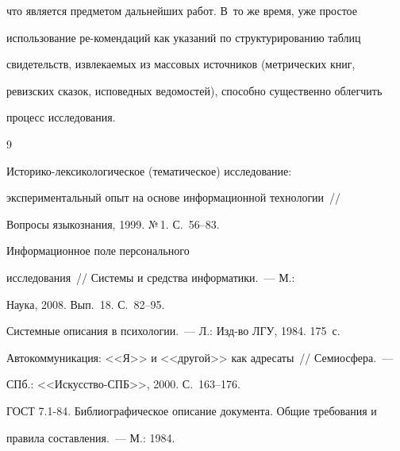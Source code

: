 что является предметом дальнейших работ.  В~то же время, уже простое 


использование ре-\linebreak комендаций как указаний по структурированию таблиц 


свидетельств, извле\-ка\-емых из массовых источников  (метрических книг, 


ревизских сказок, исповедных ведомостей), способно существенно облегчить 


процесс исследования.





{\small\frenchspacing


{%




\begin{thebibliography}{9}









Историко-лексикологическое (тематическое) исследование: 


экспериментальный опыт на основе информационной технологии~/\!\!/ 


Вопросы языкознания, 1999. №\,1.  С.~56--83.







 Информационное поле персонального 


исследования~/\!\!/ Системы и средства информатики.~--- М.: 


Наука, 2008.  Вып.~18. С.~82--95. 









Системные описания в психологии.~--- Л.: Изд-во ЛГУ, 1984. 175~с.









Автокоммуникация: <<Я>> и <<другой>> как адресаты~/\!\!/ Семиосфера.~--- 


СПб.:  <<Искусство-СПБ>>, 2000. С.~163--176.





 \label{end\stat}







ГОСТ 7.1-84. Библиографическое описание документа. Общие требования и 


правила составления.~--- М.: 1984.


\end{thebibliography}


}


}    


